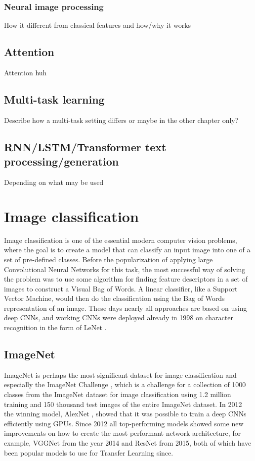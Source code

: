 \subsection{Neural image processing}
How it different from classical features and how/why it works
\section{Attention}
Attention huh
\section{Multi-task learning}
Describe how a multi-task setting differs or maybe in the other chapter only?
\section{RNN/LSTM/Transformer text processing/generation}
Depending on what may be used










\chapter{Image classification}
Image classification is one of the essential modern computer vision problems, where the goal is to create a model that can classify an input image into one of a set of pre-defined classes. Before the popularization of applying large Convolutional Neural Networks for this task, the most successful way of solving the problem was to use some algorithm for finding feature descriptors in a set of images to construct a Visual Bag of Words.  A linear classifier, like a Support Vector Machine, would then do the classification using the Bag of Words representation of an image. These days nearly all approaches are based on using deep CNNs, and working CNNs were deployed already in 1998 on character recognition in the form of LeNet \citep{leNet}.

\section{ImageNet}

ImageNet  \citep{imagenet}  is perhaps the most significant dataset for image classification and especially the ImageNet Challenge \citep{ILSVRC}, which is a challenge for a collection of 1000 classes from the ImageNet dataset for image classification using 1.2 million training and 150 thousand test images of the entire ImageNet dataset. In 2012 the winning model, AlexNet \citep{alexNet}, showed that it was possible to train a deep CNNs efficiently using GPUs. Since 2012 all top-performing models showed some new improvements on how to create the most performant network architecture, for example, VGGNet from the year 2014 and ResNet \citep{resNet} from 2015, both of which have been popular models to use for Transfer Learning since.

